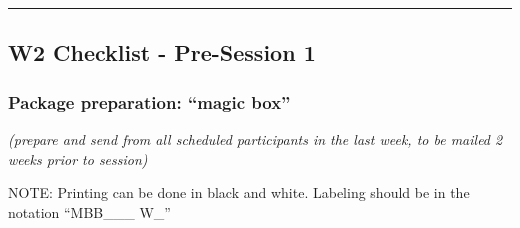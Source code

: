 \documentclass[]{book}
\begin{document}
\begin{center}\rule{0.5\linewidth}{0.5pt}\end{center}

\hypertarget{w2-checklist---pre-session-1}{%
\subsection{W2 Checklist - Pre-Session 1}\label{w2-checklist---pre-session-1}}

\hypertarget{package-preparation-magic-box-1}{%
\subsubsection{Package preparation: ``magic box''}\label{package-preparation-magic-box-1}}

\emph{(prepare and send from all scheduled participants in the last week, to be mailed 2 weeks prior to session)}

NOTE: Printing can be done in black and white. Labeling should be in the notation ``MBB\_\_\_ W\_''
\end{document}
